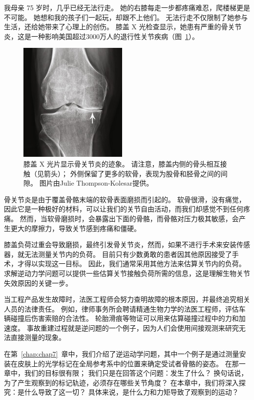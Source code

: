 我母亲 75 岁时，几乎已经无法行走。
她的右膝每走一步都疼痛难忍，爬楼梯更是不可能。
她想和我的孩子们一起玩，却跟不上他们。
无法行走不仅限制了她参与生活，还给她带来了心理上的创伤。
膝盖 X 光检查显示，她患有严重的骨关​​节炎，这是一种影响美国超过3000万人的退行性关节疾病（图~\ref{fig:8_1}）。


\begin{figure}[!htb]
	\centering
	\includegraphics[width=0.4\linewidth]{chap8/8_1}
	\caption{膝盖 X 光片显示骨关节炎的迹象。
		请注意，膝盖内侧的骨头相互接触（见箭头）；
		外侧保留了更多的软骨，表现为股骨和胫骨之间的间隙。
		图片由Julie Thompson-Kolesar提供。 \label{fig:8_1}}
\end{figure}


骨关节炎是由于覆盖骨骼末端的软骨表面磨损而引起的。
软骨很滑，没有痛觉，因此它是一种极好的材料，可以让我们的关节自由活动，而我们却感觉不到任何疼痛。
然而，当软骨磨损时，会暴露出下面的骨骼，而骨骼对压力极其敏感，会产生更大的摩擦力，导致关节感到疼痛和僵硬。


膝盖负荷过重会导致磨损，最终引发骨关节炎，然而，如果不进行手术来安装传感器，就无法测量关节内的负荷。
目前只有少数勇敢的患者因其他原因接受了手术，才得以实现这一目标。
因此，我们通常采用其他方法来估算关节内的负荷。
求解逆动力学问题可以提供一些估算关节接触负荷所需的信息，这是理解生物关节失效原因的关键一步。


当工程产品发生故障时，法医工程师会努力查明故障的根本原因，并最终追究相关人员的法律责任。
例如，律师事务所会聘请精通生物力学的法医工程师，评估车辆碰撞后伤害索赔的合法性。
轮胎滑痕等物证可以用来估算碰撞过程中的力和加速度。
事故重建过程就是逆问题的一个例子，因为人们会使用间接观测来研究无法直接测量的现象。


在第~\ref{chap:chap7}~章中，我们介绍了逆运动学问题，其中一个例子是通过测量安装在皮肤上的光学标记在全局参考系中的位置来确定受试者骨骼的姿态。
在那一章中，我们的目标很有限；
我们只是在回答这个问题：发生了什么？
换句话说，为了产生观察到的标记轨迹，必须存在哪些关节角度？
在本章中，我们将深入探究：是什么导致了这一切？
具体来说，是什么力和力矩导致了观察到的运动？


